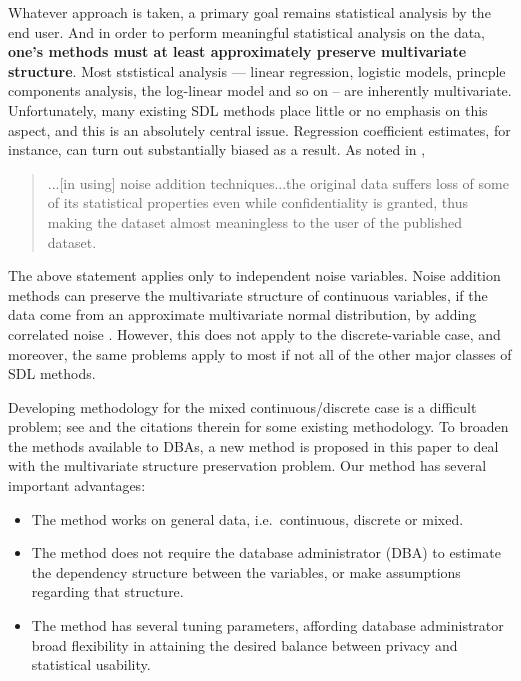 \documentclass[11pt]{article}
\begin{document}
Whatever approach is taken, a primary goal remains statistical
analysis by the end user.  And in order to perform meaningful
statistical analysis on the data, {\bf one's methods must at least
approximately preserve multivariate structure}.  Most ststistical
analysis --- linear regression, logistic models, princple components
analysis, the log-linear model and so on -- are inherently multivariate.
Unfortunately, many existing SDL methods place little or no emphasis
on this aspect, and this is an absolutely central issue.  
Regression coefficient estimates, for instance, can turn out
substantially biased as a result.  As noted in \cite{nivule},

\begin{quote}
...[in using] noise addition techniques...the original data
suffers loss of some of its statistical properties even while
confidentiality is granted, thus making the dataset almost meaningless
to the user of the published dataset. 
\end{quote}

The above statement applies only to independent noise variables. Noise
addition methods can preserve the multivariate structure of continuous
variables, if the data come from an approximate multivariate normal
distribution, by adding correlated noise \cite{matloff1986}
\cite{kim} \cite{tendick}.  However, this does not apply to the
discrete-variable case, and moreover, the same problems apply to most if
not all of the other major classes of SDL methods.

Developing methodology for the mixed continuous/discrete case is a
difficult problem; see \cite{manrique} and the citations therein for
some existing methodology.  To broaden the methods available to DBAs, a
new method is proposed in this paper to deal with the multivariate
structure preservation problem. Our method has several important
advantages:

\begin{itemize}

\item The method works on general data, i.e.\ continuous, discrete or
mixed. 

\item The method does not require the database administrator (DBA) to
estimate the dependency structure between the variables, or make
assumptions regarding that structure.

\item The method has several tuning parameters, affording database
administrator broad flexibility in attaining the desired balance between
privacy and statistical usability.

\end{itemize}
\end{document}
